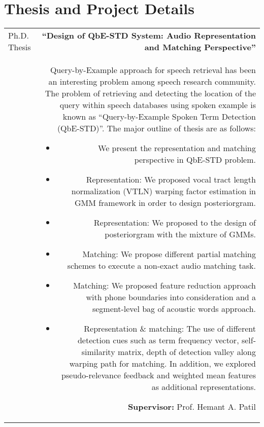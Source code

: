 \documentclass[10pt]{article}
\begin{document}
\section*{Thesis and Project Details}
\begin{tabular}{L!{\VRule}R}
Ph.D. Thesis&\textbf{``Design of QbE-STD System: Audio Representation and Matching Perspective''}\\& Query-by-Example approach for speech retrieval has been an interesting problem among speech research community. The problem of retrieving and detecting the location of the query within speech databases using spoken example is known as ``Query-by-Example Spoken Term Detection (QbE-STD)''. The major outline of thesis are as follows: \vspace{-0.3cm}\begin{itemize}
	\setlength\itemsep{0em}
	\item We present the representation and matching perspective in QbE-STD problem.
	\item Representation: We proposed vocal tract length normalization (VTLN) warping factor estimation in GMM framework in order to design posteriorgram.
	\item Representation: We proposed to the design of posteriorgram with the mixture of GMMs.
	\item Matching: We propose different partial matching schemes to execute a non-exact audio matching task. 
	\item Matching: We proposed feature reduction approach with phone boundaries into consideration and a segment-level bag of acoustic words approach. 
	\item Representation \& matching: The use of different detection cues such as term frequency vector, self-similarity matrix, depth of detection valley along warping path for matching. In addition, we explored pseudo-relevance feedback and weighted mean features as additional representations.  
\end{itemize} \textbf{Supervisor:} Prof. Hemant A. Patil \vspace{0.5cm}\\


\end{tabular}
\end{document}
